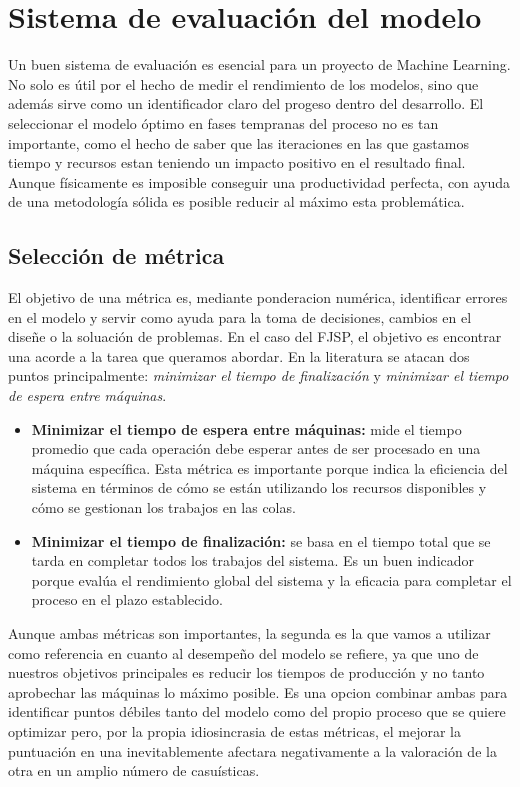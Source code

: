 \section{Sistema de evaluación del modelo}
    Un buen sistema de evaluación es esencial para un proyecto de Machine Learning. 
    No solo es útil por el hecho de medir el rendimiento de los modelos, 
    sino que además sirve como un identificador claro del progeso dentro del desarrollo. 
    El seleccionar el modelo óptimo en fases tempranas del proceso no es tan importante, 
    como el hecho de saber que las iteraciones en las que gastamos tiempo y recursos estan teniendo un impacto 
    positivo en el resultado final. Aunque físicamente es imposible conseguir una productividad 
    perfecta, con ayuda de una metodología sólida es posible reducir al máximo esta problemática.
    
    \subsection{Selección de métrica}
    El objetivo de una métrica es, mediante ponderacion numérica, identificar errores en el modelo y 
    servir como ayuda para la toma de decisiones, cambios en el diseñe o la soluación de problemas. En el caso del 
    FJSP, el objetivo es encontrar una acorde a la tarea que queramos abordar. En la literatura se atacan dos puntos
    principalmente: \textit{minimizar el tiempo de finalización} y \textit{minimizar el tiempo de espera entre máquinas}. 

    \begin{itemize}
        \item \textbf{Minimizar el tiempo de espera entre máquinas:} mide el tiempo promedio que cada operación debe 
        esperar antes de ser procesado en una máquina específica. Esta métrica es importante porque 
        indica la eficiencia del sistema en términos de cómo se están utilizando los recursos disponibles 
        y cómo se gestionan los trabajos en las colas.
        \item \textbf{Minimizar el tiempo de finalización:} se basa en el tiempo total que se tarda en completar todos 
        los trabajos del sistema. Es un buen indicador porque evalúa el rendimiento global del sistema 
        y la eficacia para completar el proceso en el plazo establecido. 
    \end{itemize}

    Aunque ambas métricas son importantes, la segunda es la que vamos a utilizar como referencia en cuanto al
    desempeño del modelo se refiere, ya que uno de nuestros objetivos principales es reducir los tiempos de producción y no tanto
    aprobechar las máquinas lo máximo posible. Es una opcion combinar ambas para identificar puntos débiles tanto del modelo 
    como del propio proceso que se quiere optimizar pero, por la propia idiosincrasia de estas métricas, el mejorar la puntuación
    en una inevitablemente afectara negativamente a la valoración de la otra en un amplio número de casuísticas.

